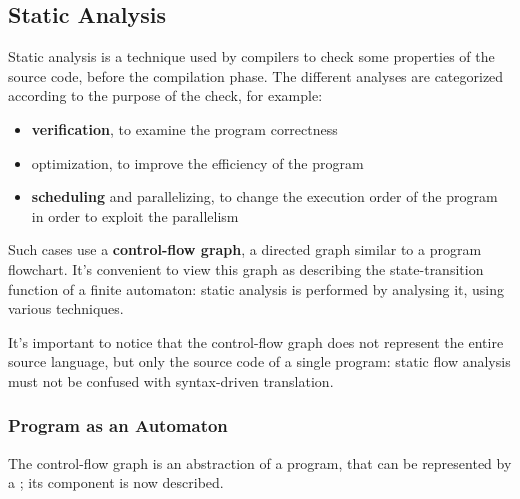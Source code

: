 \documentclass[english]{article}
\begin{document}
\subsection{Static Analysis}

Static analysis is a technique used by compilers to check some properties of the source code, before the compilation phase.
The different analyses are categorized according to the purpose of the check, for example:

\begin{itemize}
  \item \textbf{verification}, to examine the program correctness
  \item optimization, to improve the efficiency of the program
  \item \textbf{scheduling} and parallelizing, to change the execution order of the program in order to exploit the parallelism
\end{itemize}

Such cases use a \textbf{control-flow graph}, a directed graph similar to a program flowchart.
It's convenient to view this graph as describing the state-transition function of a finite automaton:
static analysis is performed by analysing it, using various techniques.

It's important to notice that the control-flow graph does not represent the entire source language, but only the source code of a single program:
static flow analysis must not be confused with syntax-driven translation.

\subsubsection{Program as an Automaton}

The control-flow graph is an abstraction of a program, that can be represented by a \FSA;
its component is now described.
\end{document}
